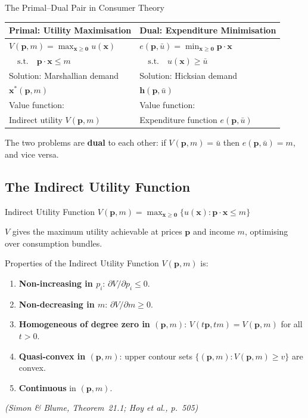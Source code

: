 \documentclass[12pt, a4paper]{article}
\theoremstyle{definition}
\newcommand{\bx}{\mathbf{x}}
\newcommand{\bp}{\mathbf{p}}
\newcommand{\bz}{\mathbf{0}}
\begin{document}
\begin{dualbox}{The Primal--Dual Pair in Consumer Theory}
\begin{center}
\begin{tabular}{p{6.2cm} p{6.2cm}}
  \textbf{Primal: Utility Maximisation} & \textbf{Dual: Expenditure Minimisation} \\
  \midrule
  $V(\bp, m) = \max_{\bx\geq\bz} u(\bx)$ & $e(\bp, \bar u) = \min_{\bx\geq\bz} \bp\cdot\bx$ \\
  $\quad\text{s.t.}\quad \bp\cdot\bx \leq m$ & $\quad\text{s.t.}\quad u(\bx)\geq\bar u$ \\[6pt]
  Solution: Marshallian demand & Solution: Hicksian demand \\
$\mathbf{x}^*(\mathbf{p},m)$ & $\mathbf{h}(\mathbf{p},\bar{u})$ \\[6pt]
  Value function: & Value function: \\
  Indirect utility $V(\bp, m)$ & Expenditure function $e(\bp, \bar u)$ \\
\end{tabular}
\end{center}
The two problems are \textbf{dual} to each other: if $V(\bp,m) = \bar u$
then $e(\bp,\bar u) = m$, and vice versa.
\end{dualbox}

\subsection{The Indirect Utility Function}

\begin{defbox}{Indirect Utility Function}
$V(\bp, m) = \max_{\bx\geq\bz}\{u(\bx) : \bp\cdot\bx \leq m\}$

$V$ gives the maximum utility achievable at prices $\bp$ and income $m$,
optimising over consumption bundles.
\end{defbox}

\begin{thmbox}{Properties of the Indirect Utility Function}
$V(\bp,m)$ is:
\begin{enumerate}
  \item \textbf{Non-increasing in $p_i$}: $\partial V/\partial p_i \leq 0$.
  \item \textbf{Non-decreasing in $m$}: $\partial V/\partial m \geq 0$.
  \item \textbf{Homogeneous of degree zero in $(\bp,m)$}:
        $V(t\bp, tm) = V(\bp,m)$ for all $t>0$.
  \item \textbf{Quasi-convex in $(\bp,m)$}: upper contour sets
        $\{(\bp,m): V(\bp,m)\geq v\}$ are convex.
  \item \textbf{Continuous} in $(\bp,m)$.
\end{enumerate}
\emph{(Simon \& Blume, Theorem~21.1; Hoy et al., p.\ 505)}
\end{thmbox}
\end{document}
